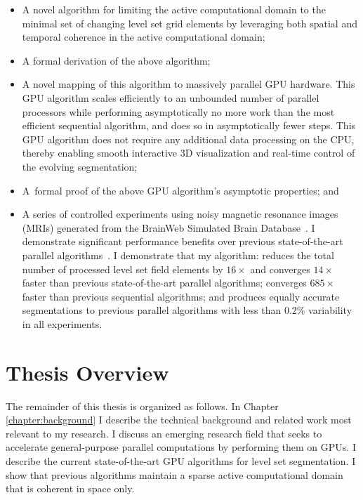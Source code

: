 \begin{itemize}

    \item A novel algorithm for limiting the active computational domain to the minimal set of changing level set grid elements by leveraging both spatial and temporal coherence in the active computational domain;

    \item A formal derivation of the above algorithm;
    
    \item A novel mapping of this algorithm to massively parallel GPU hardware. This GPU algorithm scales efficiently to an unbounded number of parallel processors while performing asymptotically no more work than the most efficient sequential algorithm, and does so in asymptotically fewer steps. This GPU algorithm does not require any additional data processing on the CPU, thereby enabling smooth interactive 3D visualization and real-time control of the evolving segmentation;

    \item A\ formal proof of the above GPU algorithm's asymptotic properties;
and
    \item A series of controlled experiments using noisy magnetic resonance images (MRIs) generated from the BrainWeb Simulated Brain Database~\cite{BrainWeb-2010,Kwan-1996,Cocosco-1997,Collins-1998,Kwan-1999}. I demonstrate significant performance benefits over previous state-of-the-art parallel algorithms~\cite{Lefohn-2003-MICCAI,Lefohn-2003-Vis,Cates-2004,Lefohn-2004}. I demonstrate that my algorithm: reduces the total number of processed level set field elements by $16 \times$ and converges $14 \times$ faster than previous state-of-the-art parallel algorithms; converges $685 \times$ faster than previous sequential algorithms; and produces equally accurate segmentations to previous parallel algorithms with less than 0.2\% variability in all experiments.



\end{itemize}

\section{Thesis Overview}

The remainder of this thesis is organized as follows. In Chapter \ref{chapter:background} I describe the technical background and related work most relevant to my research. I discuss an emerging research field that seeks to accelerate general-purpose parallel computations by performing them on GPUs. I describe the current state-of-the-art GPU algorithms for level set segmentation. I show that previous algorithms maintain a sparse active computational domain that is coherent in space only.

